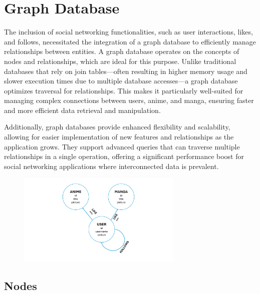 \vspace{\baselineskip}

\section{Graph Database}

The inclusion of social networking functionalities, such as user interactions, likes, and follows, necessitated the 
integration of a graph database to efficiently manage relationships between entities. A graph database operates on 
the concepts of nodes and relationships, which are ideal for this purpose. Unlike traditional databases that rely on 
join tables—often resulting in higher memory usage and slower execution times due to multiple database accesses—a graph 
database optimizes traversal for relationships. This makes it particularly well-suited for managing complex connections 
between users, anime, and manga, ensuring faster and more efficient data retrieval and manipulation.

\vspace{\baselineskip}

Additionally, graph databases provide enhanced flexibility and scalability, allowing for easier implementation of 
new features and relationships as the application grows. They support advanced queries that can traverse multiple 
relationships in a single operation, offering a significant performance boost for social networking applications 
where interconnected data is prevalent.

\begin{figure}[htbp]\label{fig:GraphDB}
  \centering
  \includegraphics[width=0.7\textwidth]{Media/graph.pdf}
\end{figure}

\newpage

\subsection*{Nodes}


